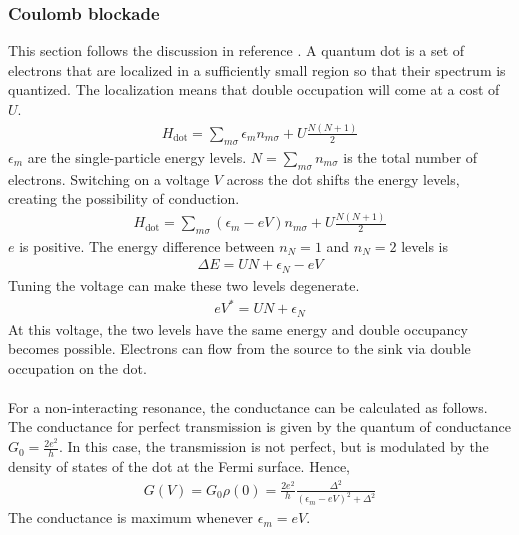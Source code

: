 \documentclass[twoside]{report}
\numberwithin{equation}{section}
\begin{document}
\subsubsection{Coulomb blockade}
This section follows the discussion in reference \cite{piers}. A quantum dot is a set of electrons that are localized in a sufficiently small region so that their spectrum is quantized.
The localization means that double occupation will come at a cost of \(U\).
\begin{equation}\begin{aligned}
H_\text{dot} = \sum_{m\sigma} \epsilon_m n_{m\sigma} + U\frac{N(N+1)}{2}
\end{aligned}\end{equation}
\(\epsilon_m\) are the single-particle energy levels.
\(N =\sum_{m\sigma} n_{m\sigma}\) is the total number of electrons.
Switching on a voltage \(V\) across the dot shifts the energy levels, creating the possibility of conduction.
\begin{equation}\begin{aligned}
	H_\text{dot} = \sum_{m\sigma} \left(\epsilon_m -eV\right) n_{m\sigma} + U\frac{N(N+1)}{2}
\end{aligned}\end{equation}
\(e\) is positive.
The energy difference between \(n_{N}=1\) and \(n_N = 2\) levels is
\begin{equation}\begin{aligned}
\Delta E = UN + \epsilon_{N} -eV
\end{aligned}\end{equation}
Tuning the voltage can make these two levels degenerate.
\begin{equation}\begin{aligned}
eV^* = UN + \epsilon_{N}
\end{aligned}\end{equation}
At this voltage, the two levels have the same energy and double occupancy becomes possible.
Electrons can flow from the source to the sink via double occupation on the dot.\\\\
For a non-interacting resonance, the conductance can be calculated as follows.
The conductance for perfect transmission is given by the quantum of conductance \(G_0 = \frac{2e^2}{h}\).
In this case, the transmission is not perfect, but is modulated by the density of states of the dot at the Fermi surface.
Hence,
\begin{equation}\begin{aligned}
	G(V) = G_0 \rho(0) = \frac{2e^2}{h} \frac{\Delta^2}{\left(\epsilon_m - eV\right)^2 + \Delta^2}
\end{aligned}\end{equation}
The conductance is maximum whenever \(\epsilon_m = eV\).
\end{document}
